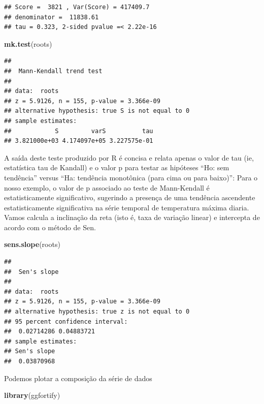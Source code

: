 \documentclass[
]{book}
\newenvironment{Shaded}{\begin{snugshade}}{\end{snugshade}}
\newcommand{\KeywordTok}[1]{\textcolor[rgb]{0.13,0.29,0.53}{\textbf{#1}}}
\newcommand{\NormalTok}[1]{#1}
\begin{document}
\begin{verbatim}
## Score =  3821 , Var(Score) = 417409.7
## denominator =  11838.61
## tau = 0.323, 2-sided pvalue =< 2.22e-16
\end{verbatim}

\begin{Shaded}
\begin{Highlighting}[]
\KeywordTok{mk.test}\NormalTok{(roots)}
\end{Highlighting}
\end{Shaded}

\begin{verbatim}
## 
##  Mann-Kendall trend test
## 
## data:  roots
## z = 5.9126, n = 155, p-value = 3.366e-09
## alternative hypothesis: true S is not equal to 0
## sample estimates:
##            S         varS          tau 
## 3.821000e+03 4.174097e+05 3.227575e-01
\end{verbatim}

A saída deste teste produzido por R é concisa e relata apenas o valor de tau (ie, estatística tau de Kandall) e o valor p para testar as hipóteses
``Ho: sem tendência'' versus ``Ha: tendência monotônica (para cima ou para baixo)'':
Para o nosso exemplo, o valor de p associado ao teste de Mann-Kendall é estatisticamente significativo, sugerindo a presença de uma tendência ascendente estatisticamente significativa na série temporal de temperatura máxima diaria.
Vamos calcula a inclinação da reta (isto é, taxa de variação linear) e intercepta de acordo com o método de Sen.

\begin{Shaded}
\begin{Highlighting}[]
\KeywordTok{sens.slope}\NormalTok{(roots)}
\end{Highlighting}
\end{Shaded}

\begin{verbatim}
## 
##  Sen's slope
## 
## data:  roots
## z = 5.9126, n = 155, p-value = 3.366e-09
## alternative hypothesis: true z is not equal to 0
## 95 percent confidence interval:
##  0.02714286 0.04883721
## sample estimates:
## Sen's slope 
##  0.03870968
\end{verbatim}

Podemos plotar a composição da série de dados

\begin{Shaded}
\begin{Highlighting}[]
\KeywordTok{library}\NormalTok{(ggfortify)}
\end{Highlighting}
\end{Shaded}
\end{document}
